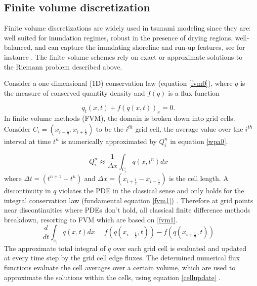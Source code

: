 \documentclass[10pt,a4paper]{article}
\begin{document}
	\subsection{Finite volume discretization}
Finite volume discretizations are widely used in tsunami modeling since they are: well suited for inundation regimes, robust in the presence of drying regions, well-balanced, and can capture the inundating shoreline and run-up features, see for instance \citet{ge:2008,ge:2011,george2006finite,be-ge-le-ma:2011,bi2014finite,leveque2002finite,ba-le-mi-ro:2003}. The finite volume schemes rely on exact or approximate solutions to the Riemann problem described above.

Consider a one dimensional (1D) conservation law  (equation \eqref{fvm0}),  where $q$ is the measure of conserved quantity density and $f(q)$ is a flux function

	\begin{equation}
		q_{t}(x,t) + f(q(x,t))_{x} = 0.
		\label{fvm0}
	\end{equation}	
	In finite volume methods (FVM), the domain is broken down into grid cells. Consider $C_{i} = (x_{i-\frac{1}{2}},x_{i+\frac{1}{2}})$ to be the $i^{th}$ grid cell, the average value over the $i^{th}$ interval at time $t^{n}$ is numerically approximated by $Q_{i}^{n}$ in equation \eqref{wpa0}.
	
	\begin{equation}
		Q_{i}^{n} \approx \dfrac{1}{\Delta x} \int_{C_{i}}q(x,t^{n})dx
		\label{wpa0}
	\end{equation}
	where $\Delta t = (t^{n+1} - t^{n})$ and  $\Delta x = (x_{i+\frac{1}{2}} - x_{i-\frac{1}{2}})$ is the cell length. A discontinuity in $q$ violates the PDE in the classical sense and only holds for the integral conservation law (fundamental equation \eqref{fvm1}) \cite{leveque2002finite}. Therefore at grid points near discontinuities where PDEs don't hold, all classical finite difference methods breakdown, resorting to FVM which are based on \eqref{fvm1}. 	
	\begin{equation}
		\frac{d}{dt} \int_{c_{i}} q(x,t)dx = f(q(x_{i-\frac{1}{2}},t)) -  f(q(x_{i+\frac{1}{2}},t))
		\label{fvm1}
	\end{equation}	
	The approximate  total integral of $q$ over each grid cell is evaluated and updated at every time step by the grid cell edge fluxes. The determined numerical flux functions evaluate the  cell averages over a certain volume, which are used to approximate the solutions within the cells, using equation \eqref{cellupdate} \cite{le-ge-be:2011}.
	
\end{document}
